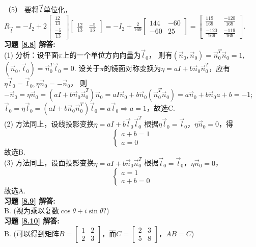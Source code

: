 \documentclass[a4paper]{book}
\begin{document}
（5） 要将$\vec{l}$单位化，\\
      $R_{\vec{l}} =-I_2+2\begin{bmatrix}\frac{12}{13}\\ \frac{-5}{13}\end{bmatrix}
      \begin{bmatrix}\frac{12}{13}&\frac{-5}{13}\end{bmatrix}=-I_2+\frac{2}{169}\begin{bmatrix}144&-60\\-60&25\end{bmatrix}=
      \begin{bmatrix}\frac{119}{169}&\frac{-120}{169}\\ \frac{-120}{169}&\frac{-119}{169}\end{bmatrix}.$\\
\textbf{习题 \ref{8.8} 解答:}\\
(1) 分析：设平面$\pi$上的一个单位方向向量为$\vec{l}_0$，
则有$(\vec{n}_0,\vec{n}_0)=\vec{n}_0^T\vec{n}_0=1$,$(\vec{n}_0,\vec{l}_0)=\vec{n}_0^T\vec{l}_0=0$.
设关于$\pi$的镜面对称变换为$\eta=aI+b\vec{n}_0\vec{n}_0^T$，应有$\eta\vec{l}_0=\vec{l}_0,\eta\vec{n}_0=-\vec{n}_0$，
则$-\vec{n}_0=\eta\vec{n}_0=(aI+b\vec{n}_0\vec{n}_0^T)\vec{n}_0=aI\vec{n}_0+b\vec{n}_0 (\vec{n}_0^T\vec{n}_0)=a\vec{n}_0
+b\vec{n}_0a+b=-1$; $\vec{l}_0=\eta\vec{l}_0=(aI+b\vec{n}_0\vec{n}_0^T )\vec{l}_0=a\vec{l}_0 \Rightarrow a=1$，故选C.\\
(2)  方法同上，设线投影变换$\eta=aI+b\vec{l}_0\vec{l}_0^T$ 根据$\eta\vec{l}_0=\vec{l}_0$，$\eta\vec{n}_0=0$，得
\begin{equation*}\begin{cases}a+b=1\\a=0\end{cases}\end{equation*}
故选B.\\
(3)  方法同上，设面投影变换$\eta=aI+b\vec{n}_0 \vec{n}_0^T$ 根据$\vec{l}_0=\vec{l}_0$，$\eta\vec{n}_0=0$，
\begin{equation*}\begin{cases}a=1\\a+b=0\end{cases}\end{equation*}
故选A.\\
\textbf{习题 \ref{8.9} 解答:}\\
B.  (视为乘以复数$\cos\theta+i\sin\theta?$)\\
\textbf{习题 \ref{8.10} 解答:}\\
B.  (可以得到矩阵$B=\begin{bmatrix}1&2\\2&3\end{bmatrix}$，而$C=\begin{bmatrix}2&3\\5&8\end{bmatrix}$，$AB=C$)\\
\end{document}
